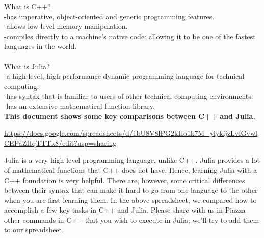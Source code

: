 
\begin{tcolorbox}[title=\textbf{\Large C++ vs Julia: What are the differences?}]


What is C++?\\ 
-has imperative, object-oriented and generic programming features.\\
-allows low level memory manipulation.\\
-compiles directly to a machine's native code: allowing it to be one of the fastest languages in the world.
\\\\
What is Julia?\\ 
-a high-level, high-performance dynamic programming language for technical computing.\\
-has syntax that is familiar to users of other technical computing environments. \\
-has an extensive mathematical function library.\\

\textbf{This document shows some key comparisons between C++ and Julia.}


\begin{center}
\url{https://docs.google.com/spreadsheets/d/1bU8V8lPG2kHo1k7M_ylykijzLvfGvwlCEPaZHqTTTk8/edit?usp=sharing
}
\end{center}


\end{tcolorbox}
\vspace*{.2cm}

Julia is a very high level programming language, unlike C++. Julia provides a lot of mathematical functions that C++ does not have. Hence, learning Julia with a C++ foundation is very helpful. There are, however, some critical differences between their syntax that can make it hard to go from one language to the other when you are first learning them. In the above spreadsheet, we compared how to accomplish a few key tasks in C++ and Julia. Please share with us in Piazza other commands in C++ that you wish to execute in Julia; we'll try to add them to our spreadsheet.
